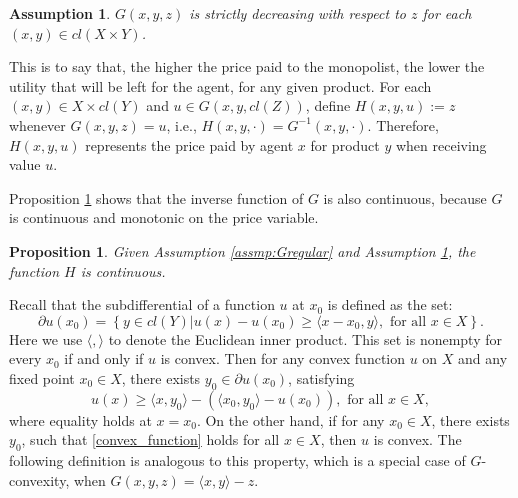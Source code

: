 \documentclass[a4paper, 11pt]{amsart}
\numberwithin{equation}{section}
\theoremstyle{plain}
\newtheorem{proposition}[theorem]{Proposition}
\newtheorem{assumption}{Assumption}
\theoremstyle{definition}
\theoremstyle{remark}
\begin{document}
 
 
 \begin{assumption}\label{assmp:Gdecreasing}
 	$G(x,y,z)$ is strictly decreasing with respect to $z$ %
 	for each $(x,y) \in cl(X \times Y)$.
 \end{assumption}
 
 
 This is to say that, the higher the price paid to the monopolist, the lower the utility that will be left for the agent, for any given product. %
 For each $(x, y) \in X\times cl(Y)$ %
 and $u\in G(x,y, cl(Z))$, define $H(x,y,u) := z$ %
 whenever $G(x,y,z) = u$, i.e., $H(x, y, \cdot)= G^{-1}(x,y,\cdot)$. Therefore, $H(x,y,u)$ represents the price paid by agent $x$ for product $y$ when receiving value $u$.\medskip
 
 Proposition \ref{lemma_continuity} shows that the inverse function of $G$ is also continuous, because $G$ is continuous and monotonic on the price variable. \medskip
 
 \begin{proposition}\label{lemma_continuity}
 	Given Assumption \ref{assmp:Gregular} and Assumption \ref{assmp:Gdecreasing}, the function $H$ is continuous.
 \end{proposition}

{Recall that the subdifferential of a function $u$ at $x_0$ is defined as the set:
	\begin{equation*}
	\partial u(x_0) = \left\{ y \in cl(Y)| u(x) - u(x_0) \ge \langle  x- x_0,  y \rangle, \text{ for all } x \in X  \right\}.
	\end{equation*}
	Here we use $ \langle , \rangle$ to denote the Euclidean inner product. This set is nonempty for every $x_0$ if and only if $u$ is convex.} Then for any convex function $u$ on $X$ and any fixed point $x_0 \in X$, there exists $y_0 \in \partial u(x_0)$, satisfying%
\begin{equation}\label{convex_function}
u(x) \ge  \langle x , y_0\rangle -\left(\langle x_0, y_0\rangle -  u(x_0)\right),	\text{  for all $x \in X$},
\end{equation} 
where equality holds at $x = x_0$. On the other hand, if for any $x_0\in X$, there exists $y_0$, such that \eqref{convex_function} holds for all $x\in X$, then $u$ is convex. The following definition is analogous to this property, which is a special case of $G$-convexity, when $G(x,y,z) = \langle x, y \rangle -z$.
\end{document}
